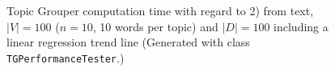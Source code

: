 \documentclass[10pt, a4paper, oneside]{article}
\begin{document}
\begin{figure}
\caption{Topic Grouper computation time with regard to 2) from text, $|V| = 100$ ($n = 10$, 10 words per topic) and $|D| = 100$ including a linear regression trend line (Generated with class \texttt{TGPerformanceTester}.)}
\label{perf1}
\end{figure}
\end{document}
